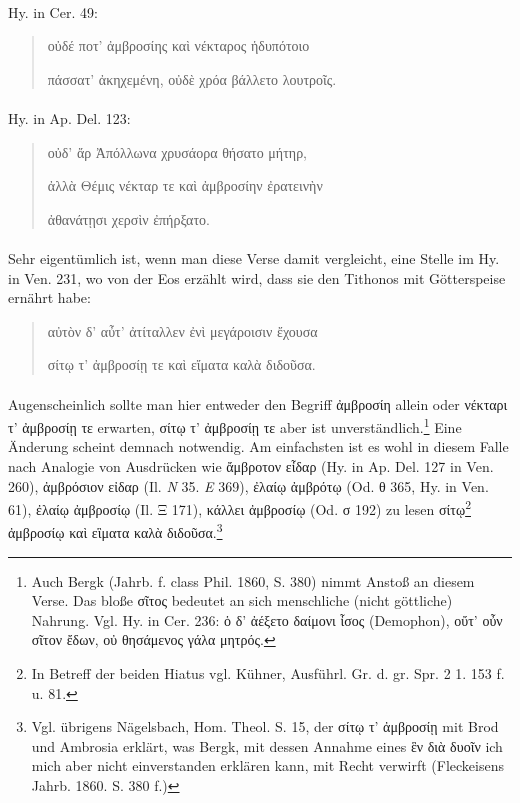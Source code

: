 \documentclass[a4paper, 11pt, oneside]{article}
\begin{document}
\paragraph{}
Hy. in Cer. 49:
\begin{quotation}
οὐδέ ποτ' ἀμβροσίης καὶ νέκταρος ἡδυπότοιο

πάσσατ' ἀκηχεμένη, οὐδὲ χρόα βάλλετο λουτροῖς.
\end{quotation}
\paragraph{}
Hy. in Ap. Del. 123:
\begin{quotation}
οὐδ' ἄρ Ἀπόλλωνα χρυσάορα θήσατο μήτηρ,

ἀλλὰ Θέμις νέκταρ τε καὶ ἀμβροσίην ἐρατεινὴν

ἀθανάτῃσι χερσὶν ἐπήρξατο.
\end{quotation}
\paragraph{}
Sehr eigentümlich ist, wenn man diese Verse damit vergleicht, eine Stelle im Hy. in Ven. 231, wo von der Eos erzählt wird, dass sie den Tithonos mit Götterspeise ernährt habe:
\begin{quotation}
αὐτὸν δ' αὖτ' ἀτίταλλεν ἐνὶ μεγάροισιν ἔχουσα

σίτῳ τ' ἀμβροσίῃ τε καὶ εἴματα καλὰ διδοῦσα.
\end{quotation}
\paragraph{}
Augenscheinlich sollte man hier entweder den Begriff ἀμβροσίη allein oder νέκταρι τ' ἀμβροσίῃ τε erwarten, σίτῳ τ' ἀμβροσίῃ τε aber ist unverständlich.\footnote{Auch Bergk (Jahrb. f. class Phil. 1860, S. 380) nimmt Anstoß an diesem Verse. Das bloße σῖτος bedeutet an sich menschliche (nicht göttliche) Nahrung. Vgl. Hy. in Cer. 236: ὁ δ' ἀέξετο δαίμονι ἶσος (Demophon), οὔτ' οὖν σῖτον ἔδων, οὐ θησάμενος γάλα μητρός.} Eine Änderung scheint demnach notwendig. Am einfachsten ist es wohl in diesem Falle nach Analogie von Ausdrücken wie ἄμβροτον εἶδαρ (Hy. in Ap. Del. 127 in Ven. 260), ἀμβρόσιον εἰδαρ (Il. \emph{N} 35. \emph{E} 369), ἐλαίῳ ἀμβρότῳ (Od. θ 365, Hy. in Ven. 61), ἐλαίῳ ἀμβροσίῳ (Il. Ξ 171), κάλλει ἀμβροσίῳ (Od. σ 192) zu lesen σίτῳ\footnote{In Betreff der beiden Hiatus vgl. Kühner, Ausführl. Gr. d. gr. Spr. 2 1. 153 f. u. 81.} ἀμβροσίῳ καὶ εἳματα καλὰ διδοῦσα.\footnote{Vgl. übrigens Nägelsbach, Hom. Theol. S. 15, der σίτῳ τ' ἀμβροσίῃ mit Brod und Ambrosia erklärt, was Bergk, mit dessen Annahme eines ἓν διὰ δυοῖν ich mich aber nicht einverstanden erklären kann, mit Recht verwirft (Fleckeisens Jahrb. 1860. S. 380 f.)}
\end{document}

